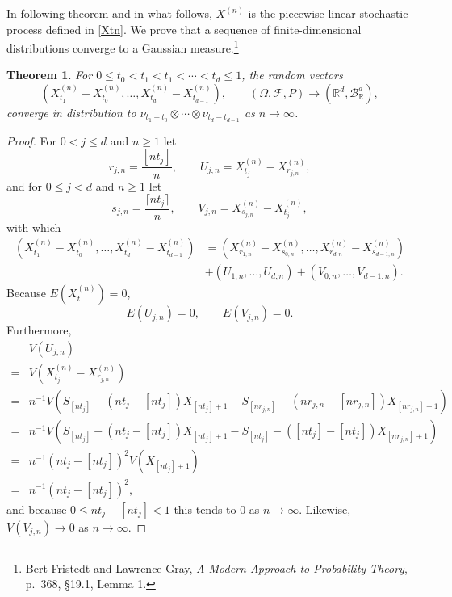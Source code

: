 \documentclass{article}
\newtheorem{theorem}{Theorem}
\theoremstyle{definition}
\begin{document}
In following theorem and in what follows, $X^{(n)}$ is the
piecewise linear stochastic process defined in \eqref{Xtn}. We prove that a sequence of finite-dimensional distributions
converge to a Gaussian measure.\footnote{Bert Fristedt and Lawrence Gray,
{\em A Modern Approach to Probability Theory}, 
p.~368, \S 19.1, Lemma 1.} 

\begin{theorem}
For $0 \leq t_0 < t_1 < t_1 < \cdots < t_d \leq 1$, the random vectors 
\[
(X^{(n)}_{t_1}-X^{(n)}_{t_0},\ldots,X^{(n)}_{t_d}-X^{(n)}_{t_{d-1}}),
\qquad (\Omega,\mathscr{F},P) \to
(\mathbb{R}^d,\mathscr{B}_{\mathbb{R}}^d),
\]
converge in distribution to $\nu_{t_1-t_0} \otimes \cdots \otimes \nu_{t_d-t_{d-1}}$ as $n \to \infty$. 
\label{jointtheorem}
\end{theorem}
\begin{proof}
For $0<j \leq d$ and $n \geq 1$ let
\[
r_{j,n} = \frac{[nt_j]}{n},\qquad U_{j,n} = X^{(n)}_{t_j} - X^{(n)}_{r_{j,n}},
\]
and for $0 \leq j < d$ and $n \geq 1$ let
\[
s_{j,n} = \frac{\lceil nt_j \rceil}{n},\qquad V_{j,n} = X^{(n)}_{s_{j,n}} - X^{(n)}_{t_j},
\]
with which
\begin{align*}
(X^{(n)}_{t_1} - X^{(n)}_{t_{0}},
\ldots,X^{(n)}_{t_d} - X^{(n)}_{t_{d-1}})&=(X^{(n)}_{r_{1,n}}-X^{(n)}_{s_{0,n}},
\ldots,X^{(n)}_{r_{d,n}}-X^{(n)}_{s_{d-1,n}})\\
&+(U_{1,n},\ldots,U_{d,n})+(V_{0,n},\ldots,V_{d-1,n}).
\end{align*}
Because $E(X^{(n)}_t)=0$, 
\[
E(U_{j,n}) = 0,\qquad E(V_{j,n})=0.
\]
Furthermore,
\[
\begin{split}
&V(U_{j,n})\\
=&V(X^{(n)}_{t_j} - X^{(n)}_{r_{j,n}})\\
=&n^{-1} V(S_{[nt_j]} +(nt_j-[nt_j]) X_{[nt_j]+1} - S_{[nr_{j,n}]} - (nr_{j,n}-[nr_{j,n}]) X_{[nr_{j,n}]+1})\\
=&n^{-1} V(S_{[nt_j]} +(nt_j-[nt_j]) X_{[nt_j]+1} - S_{[nt_j]} - ([nt_j]-[nt_j]) X_{[nr_{j,n}]+1})\\
=&n^{-1} (nt_j-[nt_j])^2 V(X_{[nt_j]+1})\\
=&n^{-1} (nt_j-[nt_j])^2,
\end{split}
\]
and because $0 \leq nt_j-[nt_j] < 1$ this tends to $0$ as $n \to \infty$. Likewise,
$V(V_{j,n}) \to 0$ as $n \to \infty$. 



\end{proof}
\end{document}
